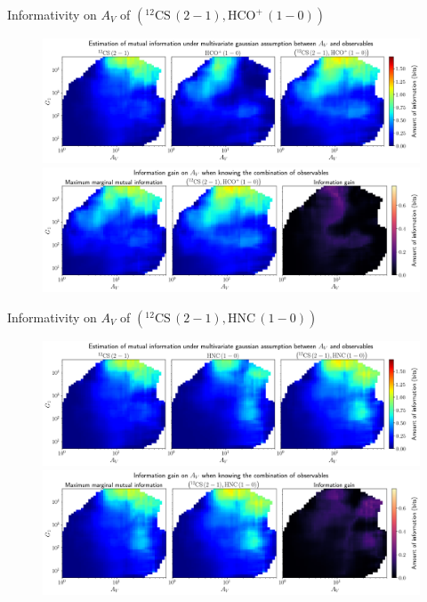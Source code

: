 \documentclass{beamer}
\begin{document}
\begin{frame}{Informativity on $A_V$ of $\left(\mathrm{^{12}CS\,(2-1)},\mathrm{HCO^+\,(1-0)}\right)$}
    \begin{figure}
        \centering
        \includegraphics[width=0.95\linewidth]{../linearinfogauss/av__12cs21_hcop10_linearinfogauss.png}
        \vfill
        \includegraphics[width=0.95\linewidth]{../linearinfogauss/av__12cs21_hcop10_linearinfogauss_gain.png}
    \end{figure}
\end{frame}

\begin{frame}{Informativity on $A_V$ of $\left(\mathrm{^{12}CS\,(2-1)},\mathrm{HNC\,(1-0)}\right)$}
    \begin{figure}
        \centering
        \includegraphics[width=0.95\linewidth]{../linearinfogauss/av__12cs21_hnc10_linearinfogauss.png}
        \vfill
        \includegraphics[width=0.95\linewidth]{../linearinfogauss/av__12cs21_hnc10_linearinfogauss_gain.png}
    \end{figure}
\end{frame}
\end{document}
